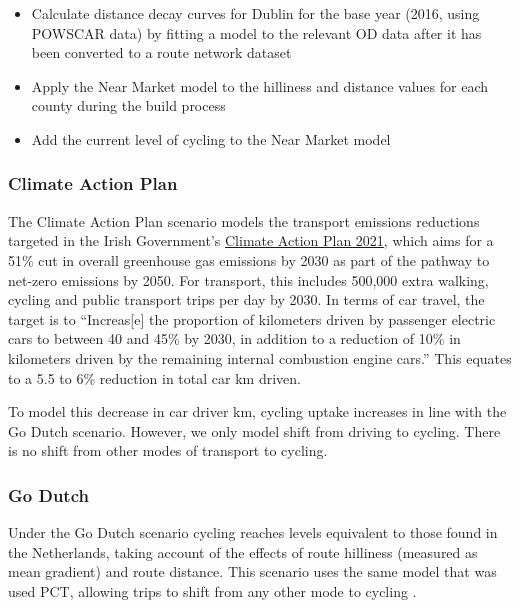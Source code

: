 \documentclass[
  super,
  preprint,
  3p]{elsarticle}
\providecommand{\tightlist}{%
  \setlength{\itemsep}{0pt}\setlength{\parskip}{0pt}}\usepackage{longtable,booktabs,array}
\begin{document}
\begin{itemize}
\tightlist
\item
  Calculate distance decay curves for Dublin for the base year (2016,
  using POWSCAR data) by fitting a model to the relevant OD data after
  it has been converted to a route network dataset
\item
  Apply the Near Market model to the hilliness and distance values for
  each county during the build process
\item
  Add the current level of cycling to the Near Market model
\end{itemize}

\hypertarget{climate-action-plan}{%
\subsubsection{Climate Action Plan}\label{climate-action-plan}}

The Climate Action Plan scenario models the transport emissions
reductions targeted in the Irish Government's
\href{https://www.gov.ie/en/publication/6223e-climate-action-plan-2021/}{Climate
Action Plan 2021}, which aims for a 51\% cut in overall greenhouse gas
emissions by 2030 as part of the pathway to net-zero emissions by 2050.
For transport, this includes 500,000 extra walking, cycling and public
transport trips per day by 2030. In terms of car travel, the target is
to ``Increas{[}e{]} the proportion of kilometers driven by passenger
electric cars to between 40 and 45\% by 2030, in addition to a reduction
of 10\% in kilometers driven by the remaining internal combustion engine
cars.'' This equates to a 5.5 to 6\% reduction in total car km driven.

To model this decrease in car driver km, cycling uptake increases in
line with the Go Dutch scenario. However, we only model shift from
driving to cycling. There is no shift from other modes of transport to
cycling.

\hypertarget{go-dutch}{%
\subsubsection{Go Dutch}\label{go-dutch}}

Under the Go Dutch scenario cycling reaches levels equivalent to those
found in the Netherlands, taking account of the effects of route
hilliness (measured as mean gradient) and route distance. This scenario
uses the same model that was used PCT, allowing trips to shift from any
other mode to cycling \citep{lovelace2017}.
\end{document}
